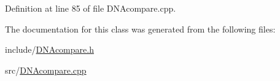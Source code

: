 Definition at line 85 of file D\+N\+Acompare.\+cpp.



The documentation for this class was generated from the following files\+:\begin{DoxyCompactItemize}
\item 
include/\hyperlink{_d_n_acompare_8h}{D\+N\+Acompare.\+h}\item 
src/\hyperlink{_d_n_acompare_8cpp}{D\+N\+Acompare.\+cpp}\end{DoxyCompactItemize}
